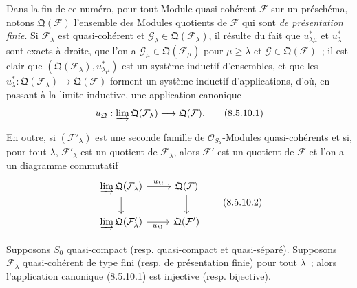 \begin{env}[8.5.10]
\label{IV.8.5.10-fr}
Dans la fin de ce numéro, pour tout Module quasi-cohérent $\mathcal F$ sur un
préschéma, notons $\mathfrak Q(\mathcal F)$ l'ensemble des Modules quotients de
$\mathcal F$ qui sont \emph{de présentation finie}. Si $\mathcal F_\lambda$ est
quasi-cohérent et $\mathcal G_\lambda\in\mathfrak Q(\mathcal F_\lambda)$, il
résulte du fait que $u_{\lambda\mu}^*$ et $u_\lambda^*$ sont exacts à droite,
que l'on a $\mathcal G_\mu\in\mathfrak Q(\mathcal F_\mu)$ pour
$\mu\geq\lambda$ et $\mathcal G\in\mathfrak Q(\mathcal F)$~; il est clair que
$(\mathfrak Q(\mathcal F_\lambda),u_{\lambda\mu}^*)$ est un système inductif
d'ensembles, et que les
$u_\lambda^*:\mathfrak Q(\mathcal F_\lambda)\to\mathfrak Q(\mathcal F)$
forment un système inductif d'applications, d'où, en passant à la limite
inductive, une application canonique
\begin{equation}
  u_{\mathfrak Q}:\varinjlim\mathfrak Q(\mathcal F_\lambda)
  \longrightarrow\mathfrak Q(\mathcal F).
  \tag{8.5.10.1}\label{IV.8.5.10.1-fr}
\end{equation}

En outre, si $(\mathcal F'_\lambda)$ est une seconde famille de
$\mathcal O_{S_\lambda}$-Modules quasi-cohérents et si, pour tout $\lambda$,
$\mathcal F'_\lambda$ est un quotient de $\mathcal F_\lambda$, alors
$\mathcal F'$ est un quotient de $\mathcal F$ et l'on a un diagramme
commutatif
\[
\begin{tikzcd}
\varinjlim\mathfrak Q(\mathcal F_\lambda)
  \ar[r,"u_{\mathfrak Q}"] \ar[d]
  & \mathfrak Q(\mathcal F) \ar[d] \\
\varinjlim\mathfrak Q(\mathcal F'_\lambda)
  \ar[r,"u_{\mathfrak Q}"']
  & \mathfrak Q(\mathcal F')
\end{tikzcd}
\tag{8.5.10.2}\label{IV.8.5.10.2-fr}
\]
\end{env}

\begin{proposition}[8.5.11]
\label{IV.8.5.11-fr}
Supposons $S_0$ quasi-compact \textup{(resp.} quasi-compact et quasi-séparé\textup{)}. Supposons
$\mathcal F_\lambda$ quasi-cohérent de type fini \textup{(resp.} de présentation finie\textup{)}
pour tout $\lambda$~; alors l'application canonique \textup{(8.5.10.1)} est injective
\textup{(resp.} bijective\textup{)}.
\end{proposition}

